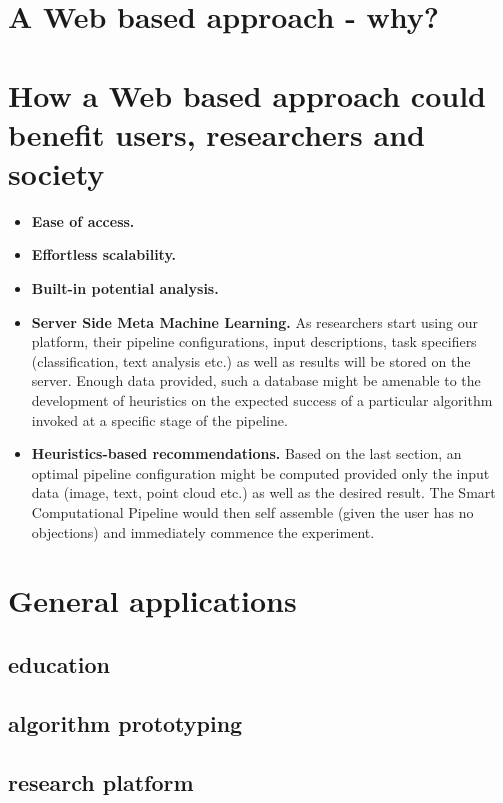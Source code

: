 \section{A Web based approach - why?}
\label{sect:web_transition}

\section{How a Web based approach could benefit users, researchers and society}
\label{sect:web_benefits}

\begin{itemize}
	\item \textbf{Ease of access.}
	\item \textbf{Effortless scalability.}
	\item \textbf{Built-in potential analysis.}
	\item \textbf{Server Side Meta Machine Learning.} As researchers start using our platform, their pipeline configurations, input descriptions, task specifiers (classification, text analysis etc.) as well as results will be stored on the server. Enough data provided, such a database might be amenable to the development of heuristics on the expected success of a particular algorithm invoked at a specific stage of the pipeline.
	\item \textbf{Heuristics-based recommendations.} Based on the last section, an optimal pipeline configuration might be computed provided only the input data (image, text, point cloud etc.) as well as the desired result. The Smart Computational Pipeline would then self assemble (given the user has no objections) and immediately commence the experiment.
\end{itemize}



\section{General applications}
\label{sect:ogma_focal_points}

\subsection{education}
\label{ssect:education}

\subsection{algorithm prototyping}
\label{ssect:algo_proto}

\subsection{research platform}
\label{ssect:research}

